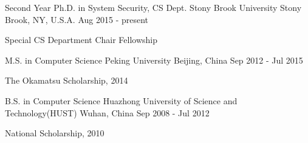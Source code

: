 \begin{cventries}
  \cventry
    {Second Year Ph.D. in System Security, CS Dept.}
    {Stony Brook University}
    {Stony Brook, NY, U.S.A.}
    {Aug 2015 - present}
    {
    \begin{cvitems}
        \item {Special CS Department Chair Fellowship}
      \end{cvitems}}
  \cventry
    {M.S. in Computer Science}
    {Peking University}
    {Beijing, China}
    {Sep 2012 - Jul 2015}
    {
      \begin{cvitems}
        \item {The Okamatsu Scholarship, 2014}
      \end{cvitems}
    }
  \cventry
    {B.S. in Computer Science}
    {Huazhong University of Science and Technology(HUST)}
    {Wuhan, China}
    {Sep 2008 - Jul 2012}
    {
      \begin{cvitems}
        \item {National Scholarship, 2010}
      \end{cvitems}
    }
\end{cventries}
